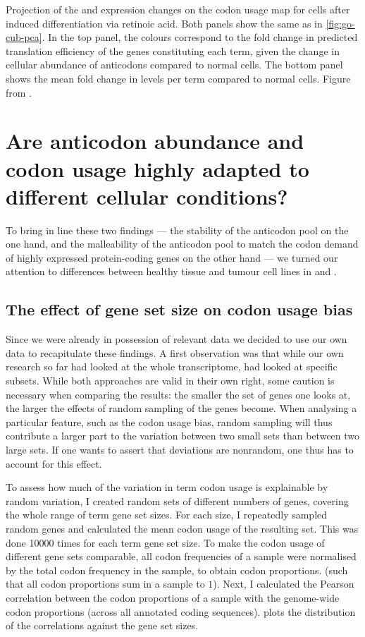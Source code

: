     {Projection of the \trna and \mrna expression changes on the codon usage
    map for cells after induced differentiation via retinoic acid.}
    {Both panels show the same \pca as in \cref{fig:go-cub-pca}. In the top
    panel, the colours correspond to the fold change in predicted translation
    efficiency of the genes constituting each \go term, given the change in
    cellular abundance of \trna anticodons compared to normal cells. The bottom
    panel shows the mean fold change in \mrna levels per \go term compared to
    normal cells. Figure from \citet{Gingold:2014}.}

\section{Are  anticodon abundance and codon usage highly adapted to
different cellular conditions?}

To bring in line these two findings — the stability of the anticodon pool on the
one hand, and the malleability of the anticodon pool to match the codon demand
of highly expressed protein-coding genes on the other hand — we turned our
attention to differences between healthy tissue and tumour cell lines in \mmu
and \hsa.

\subsection{The effect of gene set size on codon usage bias}

Since we were already in possession of relevant \trna data we decided to use our
own data to recapitulate these findings. A first observation was that while our
own research so far had looked at the whole transcriptome, \citet{Gingold:2014}
had looked at specific subsets. While both approaches are valid in their own
right, some caution is necessary when comparing the results: the smaller the set
of genes one looks at, the larger the effects of random sampling of the genes
become. When analysing a particular feature, such as the codon usage bias,
random sampling will thus contribute a larger part to the variation between two
small sets than between two large sets. If one wants to assert that deviations
are nonrandom, one thus has to account for this effect.

To assess how much of the variation in \go term codon usage is explainable by
random variation, I created random sets of different numbers of genes, covering
the whole range of \go term gene set sizes. For each size, I repeatedly sampled
random genes and calculated the mean codon usage of the resulting set. This was
done \num{10000} times for each \go term gene set size. To make the codon usage
of different gene sets comparable, all codon frequencies of a sample were
normalised by the total codon frequency in the sample, to obtain codon
proportions. (such that all codon proportions sum in a sample to \(1\)). Next, I
calculated the Pearson correlation between the codon proportions of a sample
with the genome-wide codon proportions (across all annotated coding sequences).
 plots the distribution of the correlations
against the gene set sizes.

